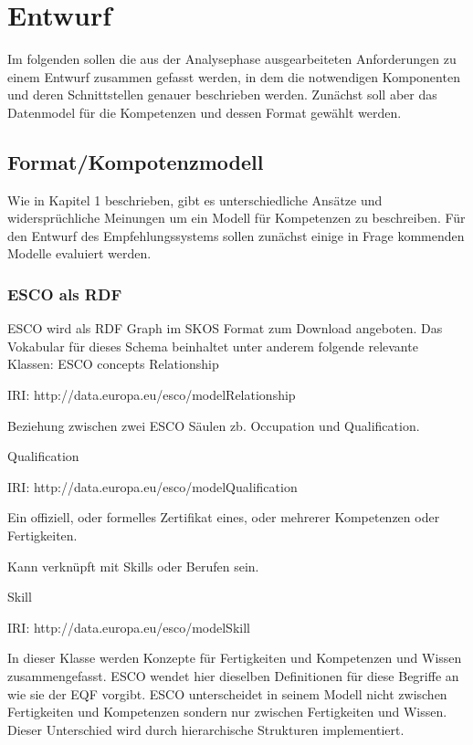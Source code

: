 \section{Entwurf}\label{entwurf}

Im folgenden sollen die aus der Analysephase  ausgearbeiteten Anforderungen zu einem Entwurf zusammen gefasst werden, in dem die notwendigen Komponenten und deren Schnittstellen genauer beschrieben werden. Zunächst soll aber das Datenmodel für die Kompetenzen und dessen Format gewählt werden.

\subsection{Format/Kompotenzmodell}

Wie in Kapitel 1 beschrieben, gibt es unterschiedliche Ansätze und widersprüchliche Meinungen um ein Modell für Kompetenzen zu beschreiben. Für den Entwurf des Empfehlungssystems sollen zunächst einige in Frage kommenden Modelle evaluiert werden. 

\subsubsection{ESCO als RDF}

ESCO wird als RDF Graph im SKOS Format zum Download angeboten. Das Vokabular\cite{esco_ontology} für dieses Schema beinhaltet unter anderem folgende relevante Klassen: 
\vspace{1em}
ESCO concepts Relationship

IRI: http://data.europa.eu/esco/modelRelationship
\newline

Beziehung zwischen zwei ESCO Säulen zb. Occupation und Qualification.

Qualification 

IRI: http://data.europa.eu/esco/modelQualification
\newline

Ein offiziell, oder formelles Zertifikat eines, oder mehrerer Kompetenzen oder Fertigkeiten.

\vspace{1em}
Kann verknüpft mit Skills oder Berufen sein.

Skill 

IRI: http://data.europa.eu/esco/modelSkill
\newline

In dieser Klasse werden Konzepte für Fertigkeiten und Kompetenzen und Wissen zusammengefasst.
\newline
 ESCO wendet hier dieselben Definitionen für diese Begriffe an wie sie der EQF vorgibt.\cite{https://ec.europa.eu/esco/portal/escopedia/Competence}
ESCO unterscheidet in seinem Modell nicht zwischen Fertigkeiten und Kompetenzen sondern nur zwischen Fertigkeiten und Wissen. Dieser Unterschied wird durch hierarchische Strukturen implementiert.  
\newline

